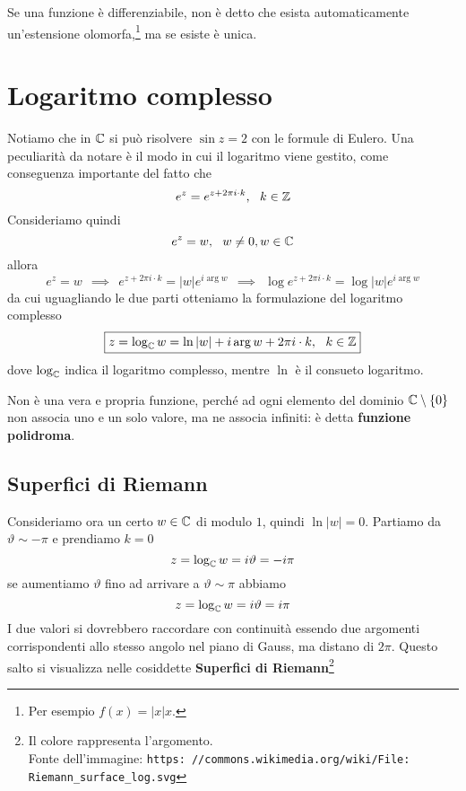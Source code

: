\begin{thm}
Se una funzione è differenziabile, non è detto che esista automaticamente un'estensione olomorfa,\footnote{Per esempio $f(x) = | x| x$.} ma se esiste è unica.
\end{thm}

\section{Logaritmo complesso}

Notiamo che in $\mathbb{C}$ si può risolvere $\sin z = 2$ con le formule di Eulero. Una peculiarità da notare è il modo in cui il logaritmo viene gestito, come conseguenza importante del fatto che
\begin{equation*}
e^{z} = e^{z + 2\pi i \cdot k}, \ \ k\in \mathbb{Z}
\end{equation*}
Consideriamo quindi
\begin{equation*}
e^{z} = w, \ \ w\neq 0, w\in \mathbb{C}
\end{equation*}
allora
\begin{equation*}
e^{z} = w\ \ \implies \ \ e^{z + 2\pi i \cdot k} = | w| e^{i\arg w} \ \ \implies \ \ \log e^{z + 2\pi i \cdot k} = \log| w| e^{i\arg w}
\end{equation*}
da cui uguagliando le due parti otteniamo la formulazione del logaritmo complesso
\begin{equation*}
\boxed{z = \log_{\mathbb{C}} w = \ln| w| + i\arg w + 2\pi i \cdot k, \ \ k\in \mathbb{Z}}
\end{equation*}
dove $\log_{\mathbb{C}}$ indica il logaritmo complesso, mentre $\ln$ è il consueto logaritmo.

Non è una vera e propria funzione, perché ad ogni elemento del dominio $\mathbb{C} \setminus \{0\}$ non associa uno e un solo valore, ma ne associa infiniti: è detta \textbf{funzione polidroma}.

\subsection{Superfici di Riemann}

Consideriamo ora un certo $w\in \mathbb{C}$ di modulo $1$, quindi $\ln| w| = 0$. Partiamo da $\vartheta \sim - \pi $ e prendiamo $k = 0$
\begin{equation*}
z = \log_{\mathbb{C}} w = i\vartheta = - i\pi
\end{equation*}
se aumentiamo $\vartheta $ fino ad arrivare a $\vartheta \sim \pi $ abbiamo
\begin{equation*}
z = \log_{\mathbb{C}} w = i\vartheta = i\pi
\end{equation*}
I due valori si dovrebbero raccordare con continuità essendo due argomenti corrispondenti allo stesso angolo nel piano di Gauss, ma distano di $2\pi $. Questo salto si visualizza nelle cosiddette \textbf{Superfici di Riemann}\footnote{Il colore rappresenta l'argomento.\\Fonte dell'immagine: \texttt{https: //commons.wikimedia.org/wiki/File: Riemann\_surface\_log.svg}}

